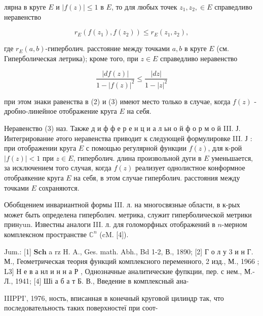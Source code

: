 \documentclass[10pt]{article}
\begin{document}
лярна в круге $E$ и $|f(z)| \leqslant 1$ в $E$, то для любых точек $z_{1}, z_{2}, \in E$ справедливо неравенство



\[

r_{E}\left(f\left(z_{1}\right), f\left(z_{2}\right)\right) \leqslant r_{E}\left(z_{1}, z_{2}\right),

\]



где $r_{E}(a, b)$-гиперболич. расстояние между точками $a, b$ в круге $E$ (см. Гиперболическая летрика); кроме того, при $z \in E$ справедливо неравенство



\[

\frac{|d f(z)|}{1-|f(z)|^{2}} \leqslant \frac{|d z|}{1-|z|^{2}}

\]



при этом знаки равенства в (2) и (3) имеют место только в случае, когда $f(z)$ - дробно-линейное отображение круга $E$ на себя.



Неравенство (3) наз. Также д и ф ф е р е н ц и а л ьн о й ф о р м о й III. Ј. Интегрирование әтого неравенства приводит к следующей формулировке III. Ј : при отображении круга $E$ с помощью регулярной функции $f(z)$, для к-рой $|f(z)|<1$ при $z \in E$, гиперболич. длина произвольной дуги в $E$ уменьшается, за исключением того случая, когда $f(z)$ реализует однолистное конформное отобраякение круга $E$ на себя, в этом случае гиперболич. расстояния между точками $E$ сохраняются.



Обобщением инвариантной формы III. л. на многосвязные области, в к-рых может быть определена гиперболич. метрика, служит гиперболической метрики принyun. Известны аналоги III. л. для голоморфных отображений в $n$-мерном комплексном пространстве $\mathbb{C}^{n}$ (cM. [4]).



Jum.: [1] $\mathbf{S} \mathbf{c} \mathbf{h}$ a $\mathrm{rz}$ H. A., Ges. math. Abh., Bd 1-2, В., 1890; [2] Г о л у 3 и н Г. М., Геометрическая теория функций комплексного переменного, 2 изд., М., 1966 ; L3] Н е в а нл и н н а Р , Однозначные аналитические фупкции, пер. с нем., М.- Л., 1941; [4] Ші а б а т Б. В., Введение в комплексный ана-



IIIPPI', 1976, ность, вписанная в конечный круговой цилиндр так, что последовательность таких поверхностеї при соот-
\end{document}
